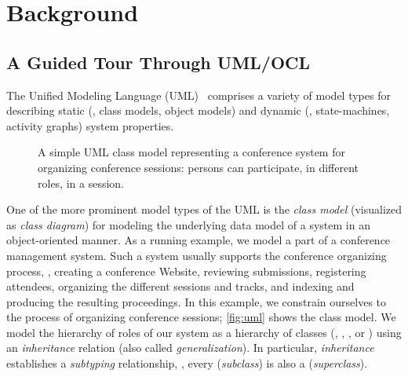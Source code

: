 \chapter{Background}
\section{A Guided Tour Through UML/OCL}
\label{sec:guidedtour}
The Unified Modeling Language
(UML)~\cite{omg:uml-infrastructure:2011,omg:uml-superstructure:2011}
comprises a variety of model types for describing static (\eg, class
models, object models) and dynamic (\eg, state-machines, activity
graphs) system properties.
\begin{figure}
  \centering{}%
  \caption{A simple UML class model representing a conference
    system for organizing conference sessions: persons can
    participate, in different roles, in a session. \label{fig:uml}}
\end{figure}
One of the more prominent model types of the UML is the
\emph{class model} (visualized as \emph{class diagram}) for modeling
the underlying data model of a system in an object-oriented manner. As
a running example, we model a part of a conference management
system. Such a system usually supports the conference organizing
process, \eg, creating a conference Website, reviewing submissions,
registering attendees, organizing the different sessions and tracks,
and indexing and producing the resulting proceedings. In this example,
we constrain ourselves to the process of organizing conference
sessions; \autoref{fig:uml} shows the class model.  We model the
hierarchy of roles of our system as a hierarchy of classes (\eg,
, , or ) using
an \emph{inheritance} relation (also called \emph{generalization}). In
particular, \emph{inheritance} establishes a \emph{subtyping}
relationship, \ie, every  (\emph{subclass}) is also
a  (\emph{superclass}).

